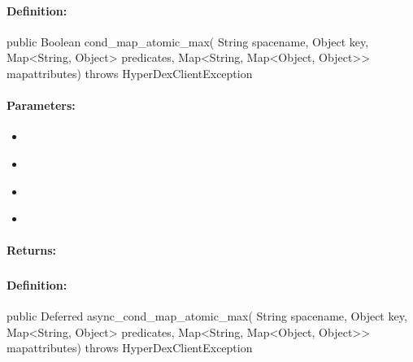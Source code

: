 \paragraph{Definition:}
\begin{javacode}
public Boolean cond_map_atomic_max(
        String spacename,
        Object key,
        Map<String, Object> predicates,
        Map<String, Map<Object, Object>> mapattributes) throws HyperDexClientException
\end{javacode}

\paragraph{Parameters:}
\begin{itemize}[noitemsep]
\item {}\\

\item {}\\

\item {}\\

\item {}\\

\end{itemize}

\paragraph{Returns:}


\pagebreak
\subsubsection{}
\label{api:java:async_cond_map_atomic_max}


\paragraph{Definition:}
\begin{javacode}
public Deferred async_cond_map_atomic_max(
        String spacename,
        Object key,
        Map<String, Object> predicates,
        Map<String, Map<Object, Object>> mapattributes) throws HyperDexClientException
\end{javacode}

